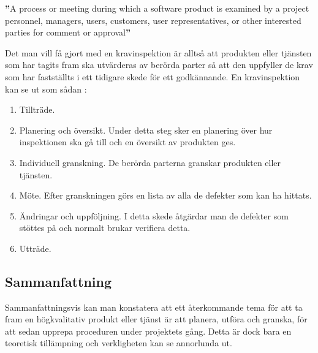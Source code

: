\begin{tcolorbox}[boxrule=1pt,leftrule=5pt,arc=0pt,auto outer arc]
\textbf{''}A process or meeting during which a software product is examined by a project personnel, managers, users, customers, user representatives, or other interested parties for comment or approval\textbf{''} \citep{SFSR}
\end{tcolorbox}

\noindent
Det man vill få gjort med en kravinspektion är alltså att produkten eller tjänsten som har tagits fram ska utvärderas av berörda parter så att den uppfyller de krav som har fastställts i ett tidigare skede för ett godkännande. En kravinspektion kan se ut som sådan \citep{Sandahl}:
\begin{enumerate}
\item{Tillträde.}
\item{Planering och översikt. Under detta steg sker en planering över hur inspektionen ska gå till och en översikt av produkten ges.}
\item{Individuell granskning. De berörda parterna granskar produkten eller tjänsten.}
\item{Möte. Efter granskningen görs en lista av alla de defekter som kan ha hittats.}
\item{Ändringar och uppföljning. I detta skede åtgärdar man de defekter som stöttes på och normalt brukar verifiera detta.}
\item{Utträde.}
\end{enumerate}

\subsection{Sammanfattning}
Sammanfattningsvis kan man konstatera att ett återkommande tema för att ta fram en högkvalitativ produkt eller tjänst är att planera, utföra och granska, för att sedan upprepa proceduren under projektets gång. Detta är dock bara en teoretisk tillämpning och verkligheten kan se annorlunda ut.
